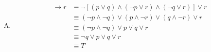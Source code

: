 {{\begin{practices}
\begin{enumerate}[A.]
{\begin{align*}
                        [p \wedge (p \rightarrow q)] \rightarrow q
                        &\equiv [p \wedge (\neg p \vee q)] \rightarrow q \\
                        &\equiv \neg [p \wedge (\neg p \vee q)] \vee q \\
                        &\equiv \neg p \vee (p \wedge \neg q) \vee q \\
                        &\equiv \neg p \vee \neg q \vee q \\
                        &\equiv T
                    \end{align*}
                }
                \item
                {
                    \begin{align*}
                        [(p \vee q) \wedge (p \rightarrow r) \wedge (q \rightarrow r)] \rightarrow r
                        &\equiv \neg [(p \vee q) \wedge (\neg p \vee r) \wedge (\neg q \vee r)] \vee r \\
                        &\equiv (\neg p \wedge \neg q) \vee (p \wedge \neg r) \vee (q \wedge \neg r) \vee r \\
                        &\equiv (\neg p \wedge \neg q) \vee p \vee q \vee r \\
                        &\equiv \neg q \vee p \vee q \vee r \\
                        &\equiv T
                    \end{align*}
                }
            \end{enumerate}
        \end{practices}

}}
